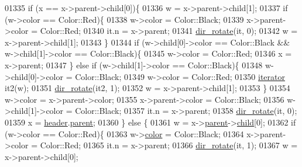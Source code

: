 \begin{DoxyCode}
01335         \textcolor{keywordflow}{if} (x == x->parent->child[0])\{
01336             w = x->parent->child[1];
01337             \textcolor{keywordflow}{if} (w->color == Color::Red)\{
01338                 w->color = Color::Black;
01339                 x->parent->color = Color::Red;
01340                 it.n = x->parent;
01341                 \hyperlink{classaed2_1_1map_a94f2862ada0c9ed4f4457eac42ea8f23_a94f2862ada0c9ed4f4457eac42ea8f23}{dir\_rotate}(it, 0);
01342                 w = x->parent->child[1];
01343             \}
01344             \textcolor{keywordflow}{if} (w->child[0]->color == Color::Black && w->child[1]->color == Color::Black)\{
01345                 w->color = Color::Red;
01346                 x = x->parent;
01347             \} \textcolor{keywordflow}{else} \textcolor{keywordflow}{if} (w->child[1]->color == Color::Black)\{
01348                 w->child[0]->color = Color::Black;
01349                 w->color = Color::Red;
01350                 \hyperlink{classaed2_1_1iterator}{iterator} it2(w);
01351                 \hyperlink{classaed2_1_1map_a94f2862ada0c9ed4f4457eac42ea8f23_a94f2862ada0c9ed4f4457eac42ea8f23}{dir\_rotate}(it2, 1);
01352                 w = x->parent->child[1];
01353             \}
01354             w->color = x->parent->color;
01355             x->parent->color = Color::Black;
01356             w->child[1]->color = Color::Black;
01357             it.n = x->parent;
01358             \hyperlink{classaed2_1_1map_a94f2862ada0c9ed4f4457eac42ea8f23_a94f2862ada0c9ed4f4457eac42ea8f23}{dir\_rotate}(it, 0);
01359             x = \hyperlink{classaed2_1_1map_a92d93f905c8ad73fba18fdc7e8915cce_a92d93f905c8ad73fba18fdc7e8915cce}{header}.\hyperlink{structaed2_1_1map_1_1Node_a91a1855da19d22344bc89c2f8b998a7a_a91a1855da19d22344bc89c2f8b998a7a}{parent};
01360         \} \textcolor{keywordflow}{else} \{
01361             w = x->\hyperlink{structaed2_1_1map_1_1Node_a91a1855da19d22344bc89c2f8b998a7a_a91a1855da19d22344bc89c2f8b998a7a}{parent}->\hyperlink{structaed2_1_1map_1_1Node_acac3478cefbd8bebe0c3f3abb9a2935e_acac3478cefbd8bebe0c3f3abb9a2935e}{child}[0];
01362             \textcolor{keywordflow}{if} (w->color == Color::Red)\{
01363                 w->\hyperlink{structaed2_1_1map_1_1Node_a58dd9993fee8ee3eaa5716b72a3eca47_a58dd9993fee8ee3eaa5716b72a3eca47}{color} = Color::Black;
01364                 x->parent->color = Color::Red;
01365                 it.n = x->parent;
01366                 \hyperlink{classaed2_1_1map_a94f2862ada0c9ed4f4457eac42ea8f23_a94f2862ada0c9ed4f4457eac42ea8f23}{dir\_rotate}(it, 1);
01367                 w = x->parent->child[0];

\end{DoxyCode}
